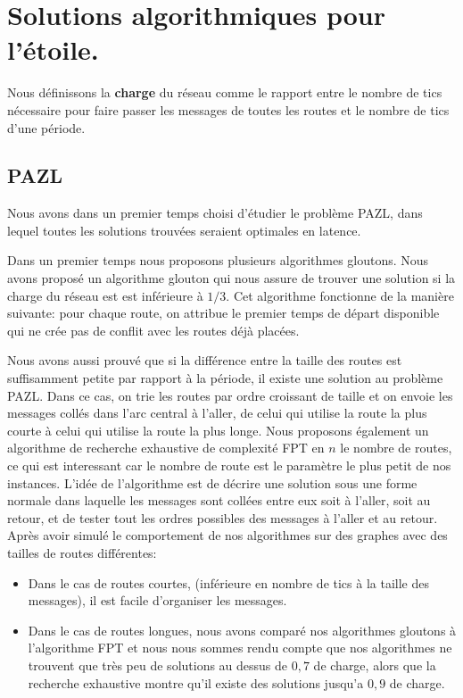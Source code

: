 \documentclass{article}
\begin{document}
\section{Solutions algorithmiques pour l'étoile.}

Nous définissons la {\bf charge} du réseau comme le rapport entre le nombre de tics nécessaire pour faire passer les messages de toutes les routes et le nombre de tics d'une période.

\subsection{PAZL}
 Nous avons dans un premier temps choisi d'étudier le problème PAZL, dans lequel toutes les solutions trouvées seraient optimales en latence.
 
 Dans un premier temps nous proposons plusieurs algorithmes gloutons. Nous avons proposé un algorithme glouton qui nous assure de trouver une solution si la charge du réseau est est inférieure à $1/3$. Cet algorithme fonctionne de la manière suivante: pour chaque route, on attribue le premier temps de départ disponible qui ne crée pas de conflit avec les routes déjà placées.
 
  Nous avons aussi prouvé que si la différence entre la taille des routes est suffisamment petite par rapport à la période, il existe une solution au problème PAZL. Dans ce cas, on trie les routes par ordre croissant de taille et on envoie les messages collés dans l'arc central à l'aller, de celui qui utilise la route la plus courte à celui qui utilise la route la plus longe.
 Nous proposons également un algorithme de recherche exhaustive de complexité FPT en $n$ le nombre de routes, ce qui est interessant car le nombre de route est le paramètre le plus petit de nos instances. L'idée de l'algorithme est de décrire une solution sous une forme normale dans laquelle les messages sont collées entre eux soit à l'aller, soit au retour, et de tester tout les ordres possibles des messages à l'aller et au retour.
 Après avoir simulé le comportement de nos algorithmes sur des graphes avec des tailles de routes différentes: 
 \begin{itemize}
 \item Dans le cas de routes courtes, (inférieure en nombre de tics à la taille des messages), il est facile d'organiser les messages.
 \item Dans le cas de routes longues, nous avons comparé nos algorithmes gloutons à l'algorithme FPT et nous nous sommes rendu compte que nos algorithmes ne trouvent que très peu de solutions au dessus de $0,7$ de charge, alors que la recherche exhaustive montre qu'il existe des solutions jusqu'a $0,9$ de charge.
 \end{itemize}
      
\end{document}

